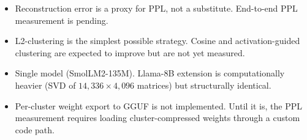\documentclass[11pt]{article}
\begin{document}
\begin{itemize}
\item Reconstruction error is a proxy for PPL, not a substitute.
      End-to-end PPL measurement is pending.
\item L2-clustering is the simplest possible strategy.  Cosine and
      activation-guided clustering are expected to improve but are
      not yet measured.
\item Single model (SmolLM2-135M).  Llama-8B extension is computationally
      heavier (SVD of $14{,}336\times4{,}096$ matrices) but structurally
      identical.
\item Per-cluster weight export to GGUF is not implemented.  Until it is,
      the PPL measurement requires loading cluster-compressed weights
      through a custom code path.
\end{itemize}

\printbibliography
\end{document}
